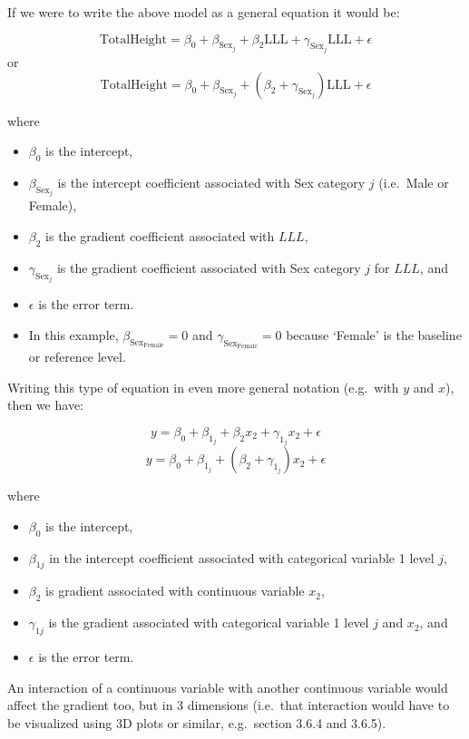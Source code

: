 \documentclass[
  oneside]{krantz}
\begin{document}
If we were to write the above model as a general equation it would be:

\[\mathrm{TotalHeight} = \beta_0 + \beta_{\textrm{Sex}_j} + \beta_2\mathrm{LLL} + \gamma_{\textrm{Sex}_j}\mathrm{LLL} + \epsilon \]
or
\[\mathrm{TotalHeight} = \beta_0 + \beta_{\textrm{Sex}_j} + (\beta_2 + \gamma_{\textrm{Sex}_j})\mathrm{LLL} + \epsilon \]

where

\begin{itemize}
\item
  \(\beta_0\) is the intercept,
\item
  \(\beta_{\textrm{Sex}_j}\) is the intercept coefficient associated with Sex category \(j\) (i.e.~Male or Female),
\item
  \(\beta_2\) is the gradient coefficient associated with \(LLL\),
\item
  \(\gamma_{\textrm{Sex}_j}\) is the gradient coefficient associated with Sex category \(j\) for \(LLL\), and
\item
  \(\epsilon\) is the error term.
\item
  In this example, \(\beta_{\textrm{Sex}_\textrm{Female}}=0\) and \(\gamma_{\textrm{Sex}_\textrm{Female}}=0\) because `Female' is the baseline or reference level.
\end{itemize}

Writing this type of equation in even more general notation (e.g.~with \(y\) and \(x\)), then we have:

\[y = \beta_0 + \beta_{1_j} + \beta_2 x_2 + \gamma_{1_j}x_2 + \epsilon\]
\[y = \beta_0 + \beta_{1_j} + (\beta_2 + \gamma_{1_j})x_2 + \epsilon\]

where

\begin{itemize}
\item
  \(\beta_0\) is the intercept,
\item
  \(\beta_{1j}\) in the intercept coefficient associated with categorical variable 1 level \(j\),
\item
  \(\beta_2\) is gradient associated with continuous variable \(x_2\),
\item
  \(\gamma_{1j}\) is the gradient associated with categorical variable 1 level \(j\) and \(x_2\), and
\item
  \(\epsilon\) is the error term.
\end{itemize}

An interaction of a continuous variable with another continuous variable would affect the gradient too, but in 3 dimensions (i.e.~that interaction would have to be visualized using 3D plots or similar, e.g.~section 3.6.4 and 3.6.5).
\end{document}
